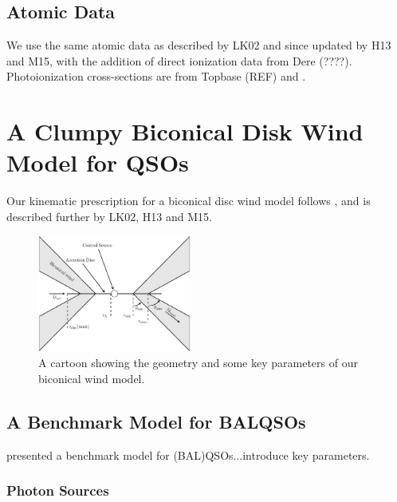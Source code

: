 \documentclass[useAMS,usenatbib]{mn2e_x}
\begin{document}
\subsection{Atomic Data}

We use the same atomic data as described by LK02 and since
updated by H13 and M15, with the addition of direct ionization data from Dere (????). 
Photoionization cross-sections are from Topbase (REF) and 
\cite{vfky}.





\bigskip
\bigskip
\bigskip

\section{A Clumpy Biconical Disk Wind Model for QSOs}

Our kinematic prescription for a biconical disc wind model
follows \cite{SV93}, and is described further by
LK02, H13 and M15. 


\begin{figure}
\centering
\includegraphics[width=0.45\textwidth]{figures/fig2_cartoon.eps}
\caption
{
A cartoon showing the geometry and some key parameters of
our biconical wind model.
}
\label{fig:cartoon}
\end{figure}



\subsection{A Benchmark Model for BALQSOs}

\cite{higginbottom2013} presented a benchmark model for
(BAL)QSOs...introduce key parameters. 

\subsubsection{Photon Sources}
\end{document}
